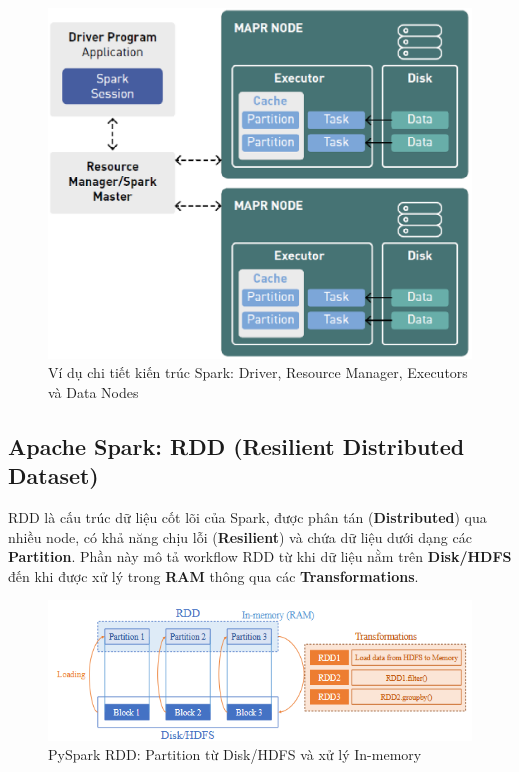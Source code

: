 \documentclass[11pt]{article}
\begin{document}
\begin{figure}[H]
    \centering
    \includegraphics[width=0.75\linewidth]{images/SparkSystemOverview.png}
    \caption{Ví dụ chi tiết kiến trúc Spark: Driver, Resource Manager, Executors và Data Nodes}
\end{figure}

\subsection{Apache Spark: RDD (Resilient Distributed Dataset)}
RDD là cấu trúc dữ liệu cốt lõi của Spark, được phân tán (\textbf{Distributed}) qua nhiều node, có khả năng chịu lỗi (\textbf{Resilient}) và chứa dữ liệu dưới dạng các \textbf{Partition}. Phần này mô tả workflow RDD từ khi dữ liệu nằm trên \textbf{Disk/HDFS} đến khi được xử lý trong \textbf{RAM} thông qua các \textbf{Transformations}.

\begin{figure}[H]
    \centering
    \includegraphics[width=0.9\linewidth]{images/pysparkRDD.png}
    \caption{PySpark RDD: Partition từ Disk/HDFS và xử lý In-memory}
\end{figure}
\end{document}
